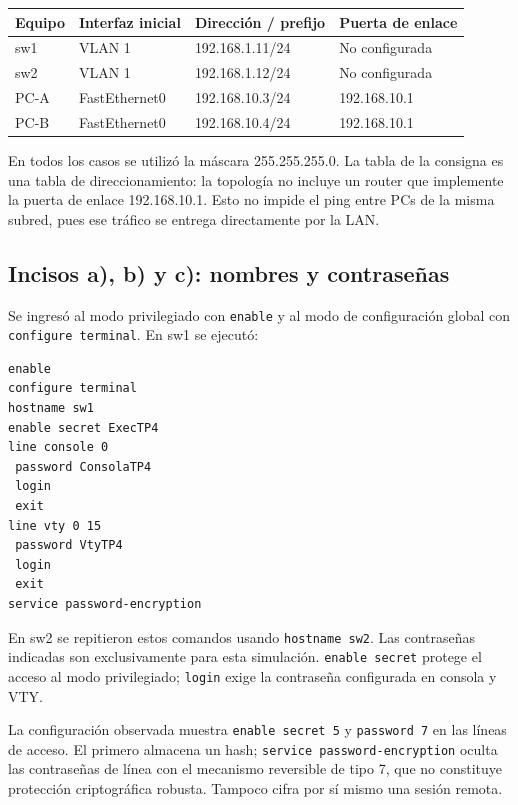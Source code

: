 \documentclass[12pt,a4paper]{article}
\begin{document}
\begin{center}
\small
\begin{tabular}{@{}llll@{}}
\toprule
Equipo & Interfaz inicial & Dirección / prefijo & Puerta de enlace \\
\midrule
sw1 & VLAN 1 & 192.168.1.11/24 & No configurada \\
sw2 & VLAN 1 & 192.168.1.12/24 & No configurada \\
PC-A & FastEthernet0 & 192.168.10.3/24 & 192.168.10.1 \\
PC-B & FastEthernet0 & 192.168.10.4/24 & 192.168.10.1 \\
\bottomrule
\end{tabular}
\end{center}
En todos los casos se utilizó la máscara 255.255.255.0. La tabla de la
consigna es una tabla de direccionamiento: la topología no incluye un
router que implemente la puerta de enlace 192.168.10.1. Esto no impide el
ping entre PCs de la misma subred, pues ese tráfico se entrega directamente
por la LAN.


\subsection{Incisos a), b) y c): nombres y contraseñas}
Se ingresó al modo privilegiado con \texttt{enable} y al modo de
configuración global con \texttt{configure terminal}. En sw1 se ejecutó:
\begin{verbatim}
enable
configure terminal
hostname sw1
enable secret ExecTP4
line console 0
 password ConsolaTP4
 login
 exit
line vty 0 15
 password VtyTP4
 login
 exit
service password-encryption
\end{verbatim}
En sw2 se repitieron estos comandos usando \texttt{hostname sw2}.
Las contraseñas indicadas son exclusivamente para esta simulación.
\texttt{enable secret} protege el acceso al modo privilegiado;
\texttt{login} exige la contraseña configurada en consola y VTY.

La configuración observada muestra \texttt{enable secret 5} y
\texttt{password 7} en las líneas de acceso. El primero almacena un hash;
\texttt{service password-encryption} oculta las contraseñas de línea con
el mecanismo reversible de tipo 7, que no constituye protección
criptográfica robusta. Tampoco cifra por sí mismo una sesión remota.
\end{document}
